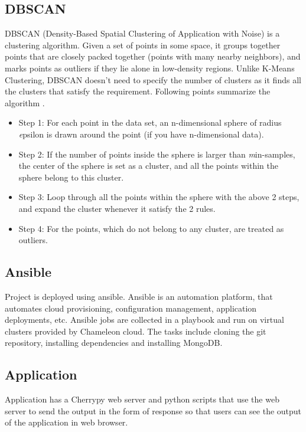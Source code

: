 \documentclass[9pt,twocolumn,twoside]{../../styles/osajnl}
\begin{document}
\subsection{DBSCAN}
DBSCAN (Density-Based Spatial Clustering of Application with Noise) is a clustering algorithm. Given a set of points in some space, it groups together points that are closely packed together (points with many nearby neighbors), and marks points as outliers if they lie alone in low-density regions. Unlike K-Means Clustering, DBSCAN doesn't need to specify the number of clusters as it finds all the clusters that satisfy the requirement. Following points summarize the algorithm \cite{www-dbscan}.

\begin{itemize}
    \item Step 1: For each point in the data set, an n-dimensional sphere of radius \emph epsilon is drawn around the point (if you have n-dimensional data).
    
    \item Step 2: If the number of points inside the sphere is larger than \emph min-samples, the center of the sphere is set as a cluster, and all the points within the sphere belong to this cluster.
    
    \item Step 3: Loop through all the points within the sphere with the above 2 steps, and expand the cluster whenever it satisfy the 2 rules.
    
    \item Step 4: For the points, which do not belong to any cluster, are treated as outliers. 
\end{itemize}

\subsection{Ansible}

Project is deployed using ansible. Ansible is an automation platform, that automates cloud provisioning, configuration management, application deployments, etc. Ansible jobs are collected in a playbook and run on virtual clusters provided by Chameleon cloud. The tasks include cloning the git repository, installing dependencies and installing MongoDB.

\subsection{Application}
Application has a Cherrypy web server and python scripts that use the web server to send the output in the form of response so that users can see the output of the application in web browser.
\end{document}
